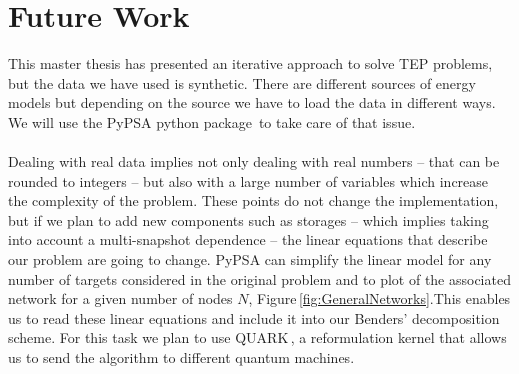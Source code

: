 \section{Future Work}
This master thesis has presented an iterative approach to solve TEP problems, but the data we have used is synthetic. There are different sources of energy models but depending on the source we have to load the data in different ways. We will use the PyPSA python package\,\cite{PyPSA-Eur:PyPSA-Eur} to take care of that issue.\\\\
Dealing with real data implies not only dealing with real numbers -- that can be rounded to integers -- but also with a large number of variables which increase the complexity of the problem. These points do not change the implementation, but if we plan to add new components such as storages -- which implies taking into account a multi-snapshot dependence -- the linear equations that describe our problem are going to change. PyPSA can simplify the linear model for any number of targets considered in the original problem and to plot of the associated network for a given number of nodes $N$, Figure\,\ref{fig:GeneralNetworks}.This enables us to read these linear equations and include it into our Benders' decomposition scheme. For this task we plan to use QUARK\,\cite{dlrsc2023quark}, a reformulation kernel that allows us to send the algorithm to different quantum machines.
